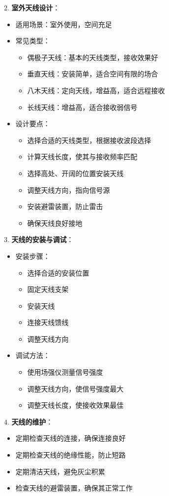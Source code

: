\documentclass[12pt,UTF8]{ctexbook}
\begin{document}
2. \textbf{室外天线设计}：
   \begin{itemize}[leftmargin=3.5em]
   \item 适用场景：室外使用，空间充足
   \item 常见类型：
     \begin{itemize}
     \item 偶极子天线：基本的天线类型，接收效果好
     \item 垂直天线：安装简单，适合空间有限的场合
     \item 八木天线：定向天线，增益高，适合远程接收
     \item 长线天线：增益高，适合接收弱信号
     \end{itemize}
   \item 设计要点：
     \begin{itemize}
     \item 选择合适的天线类型，根据接收波段选择
     \item 计算天线长度，使其与接收频率匹配
     \item 选择高处、开阔的位置安装天线
     \item 调整天线方向，指向信号源
     \item 安装避雷装置，防止雷击
     \item 确保天线良好接地
     \end{itemize}
   \end{itemize}

3. \textbf{天线的安装与调试}：
   \begin{itemize}[leftmargin=3.5em]
   \item 安装步骤：
     \begin{itemize}
     \item 选择合适的安装位置
     \item 固定天线支架
     \item 安装天线
     \item 连接天线馈线
     \item 调整天线方向
     \end{itemize}
   \item 调试方法：
     \begin{itemize}
     \item 使用场强仪测量信号强度
     \item 调整天线方向，使信号强度最大
     \item 调整天线长度，使接收效果最佳
     \end{itemize}
   \end{itemize}

4. \textbf{天线的维护}：
   \begin{itemize}[leftmargin=3.5em]
   \item 定期检查天线的连接，确保连接良好
   \item 定期检查天线的绝缘性能，防止短路
   \item 定期清洁天线，避免灰尘积累
   \item 检查天线的避雷装置，确保其正常工作
   \end{itemize}
\end{document}
